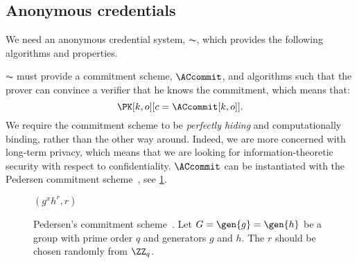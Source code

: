 \subsection{Anonymous credentials}%
\label{ZK-anon-cred}



We need an anonymous credential system, \(\AC\), which provides the following algorithms and properties.


\(\AC\) must provide a commitment scheme, \(\ACcommit\), and algorithms such that the prover can convince a verifier that he knows the commitment, which means that:
\begin{equation*}
  \PK[k, o][c = \ACcommit[k,o]].
\end{equation*}
We require the commitment scheme to be \emph{perfectly hiding} and computationally binding, rather than the other way around.
Indeed, we are more concerned with long-term privacy, which means that we are looking for information-theoretic security with respect to confidentiality.
\(\ACcommit\) can be instantiated with the Pedersen commitment 
scheme~\cite{PedersenCommitment}, see \cref{ACcommitAlg}.

\begin{figure}
  \small
  \begin{algorithmic}
    \State \Return $(g^x h^r, r)$
    \EndFunction
  \end{algorithmic}
  \caption{\label{ACcommitAlg}%
    Pedersen's commitment scheme~\cite{PedersenCommitment}.
    Let \(G = \gen{g} = \gen{h}\) be a group with prime order \(q\) and 
    generators \(g\) and \(h\).%
    The \(r\) should be chosen randomly from \(\ZZ_q\).
  }
\end{figure}

